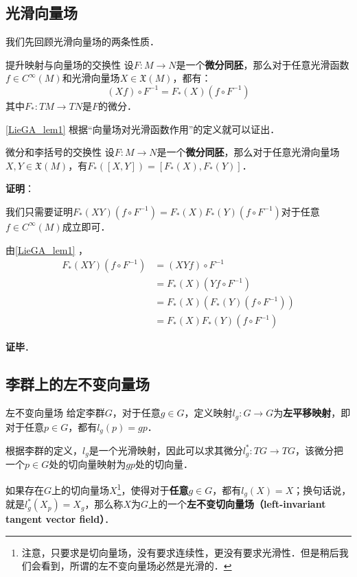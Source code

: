 

\subsection{光滑向量场}

我们先回顾光滑向量场的两条性质．

\begin{lemma}{提升映射与向量场的交换性}\label{LieGA_lem1}
设$F:M\to N$是一个\textbf{微分同胚}，那么对于任意光滑函数$f\in C^{\infty}(M)$和光滑向量场$X\in\mathfrak{X}(M)$，都有：
\begin{equation}\label{LieGA_eq1}
(Xf)\circ F^{-1}=F_*(X)(f\circ F^{-1})
\end{equation}
其中$F_*:TM\to TN$是$F$的微分．
\end{lemma}

\autoref{LieGA_lem1} 根据“向量场对光滑函数作用”的定义就可以证出．

\begin{lemma}{微分和李括号的交换性}\label{LieGA_lem2}
设$F:M\to N$是一个\textbf{微分同胚}，那么对于任意光滑向量场$X, Y\in\mathfrak{X}(M)$，有$F_*([X, Y])=[F_*(X), F_*(Y)]$．
\end{lemma}

\textbf{证明}：

我们只需要证明$F_*(XY)(f\circ F^{-1})=F_*(X)F_*(Y)(f\circ F^{-1})$对于任意$f\in C^{\infty}(M)$成立即可．

由\autoref{LieGA_lem1} ，
\begin{equation}
\begin{aligned}
F_*(XY)(f\circ F^{-1})&=(XYf)\circ F^{-1}\\
&=F_*(X)(Yf\circ F^{-1})\\
&=F_*(X)(F_*(Y)(f\circ F^{-1}))\\
&=F_*(X)F_*(Y)(f\circ F^{-1})
\end{aligned}
\end{equation}

\textbf{证毕}．

\subsection{李群上的左不变向量场}

\begin{definition}{左不变向量场}\label{LieGA_def1}
给定李群$G$，对于任意$g\in G$，定义映射$l_g:G\to G$为\textbf{左平移映射}，即对于任意$p\in G$，都有$l_g(p)=gp$．

根据李群的定义，$l_g$是一个光滑映射，因此可以求其微分$l_{g}^*:TG\to TG$，该微分把一个$p\in G$处的切向量映射为$gp$处的切向量．

如果存在$G$上的切向量场$X$\footnote{注意，只要求是切向量场，没有要求连续性，更没有要求光滑性．但是稍后我们会看到，所谓的左不变向量场必然是光滑的．}，使得对于\textbf{任意}$g\in G$，都有$l_g(X)=X$；换句话说，就是$l_{g}^*(X_p)=X_g$，那么称$X$为$G$上的一个\textbf{左不变切向量场（left-invariant tangent vector field）}．
\end{definition}

